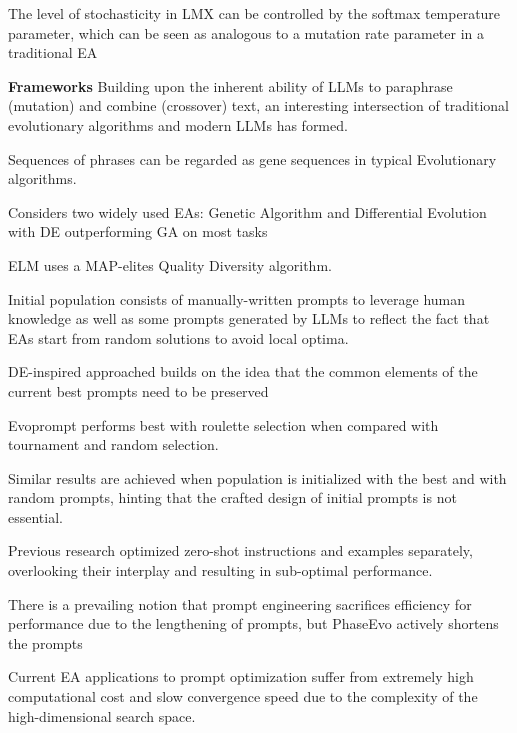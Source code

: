 The level of stochasticity in LMX can be controlled by the softmax temperature parameter, which can be seen as analogous to a mutation rate parameter in a traditional EA \cite{meyerson2024languagemodelcrossovervariation}


\textbf{Frameworks}
Building upon the inherent ability of LLMs to paraphrase (mutation) and combine (crossover) text, an interesting intersection of traditional evolutionary algorithms and modern LLMs has formed. 


Sequences of phrases can be regarded as gene sequences in typical Evolutionary algorithms. \cite{guo2024connectinglargelanguagemodels}


Considers two widely used EAs: Genetic Algorithm and Differential Evolution with DE outperforming GA on most tasks \cite{guo2024connectinglargelanguagemodels}

ELM uses a MAP-elites Quality Diversity algorithm. \cite{lehman2022evolutionlargemodels}

Initial population consists of manually-written prompts to leverage human knowledge as well as some prompts generated by LLMs to reflect the fact that EAs start from random solutions to avoid local optima. \cite{guo2024connectinglargelanguagemodels}

DE-inspired approached builds on the idea that the common elements of the current best prompts need to be preserved \cite{guo2024connectinglargelanguagemodels}

Evoprompt performs best with roulette selection when compared with tournament and random selection. \cite{guo2024connectinglargelanguagemodels}

Similar results are achieved when population is initialized with the best and with random prompts, hinting that the crafted design of initial prompts is not essential. \cite{guo2024connectinglargelanguagemodels}


Previous research optimized zero-shot instructions and examples separately, overlooking their interplay and resulting in sub-optimal performance. \cite{cui2024phaseevounifiedincontextprompt}

There is a prevailing notion that prompt engineering sacrifices efficiency for performance due to the lengthening of prompts, but PhaseEvo actively shortens the prompts \cite{cui2024phaseevounifiedincontextprompt}

Current EA applications to prompt optimization suffer from extremely high computational cost and slow convergence speed due to the complexity of the high-dimensional search space. \cite{cui2024phaseevounifiedincontextprompt}

